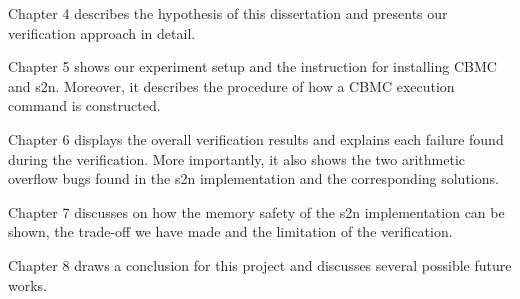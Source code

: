Chapter 4 describes the hypothesis of this dissertation and presents our verification approach in detail. 

Chapter 5 shows our experiment setup and the instruction for installing CBMC and s2n. Moreover, it describes the procedure of how a CBMC execution command is constructed.

Chapter 6 displays the overall verification results and explains each failure found during the verification. More importantly, it also shows the two arithmetic overflow bugs found in the s2n implementation and the corresponding solutions.
 
Chapter 7 discusses on how the memory safety of the s2n implementation can be shown, the trade-off we have made and the limitation of the verification.

Chapter 8 draws a conclusion for this project and discusses several possible future works. 